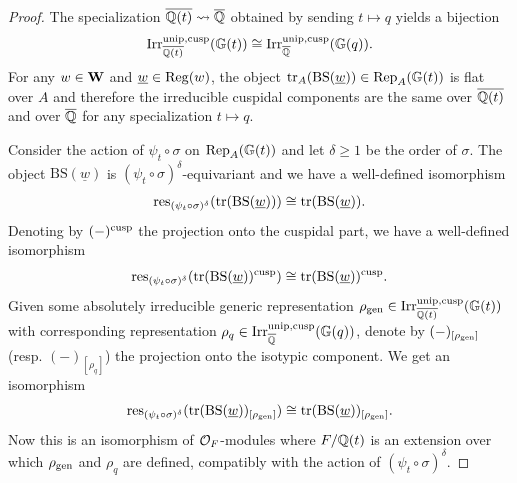 \documentclass[a4paper, 10pt, oneside, reqno]{amsart}
\theoremstyle{plain}
\theoremstyle{definition}
\theoremstyle{remark}
\newcommand{\Gbb}{\mathbb{G}}
\newcommand{\BS}{\mathrm{BS}}
\newcommand{\restr}{\mathrm{res}}
\begin{document}
\begin{proof}
The specialization $\overline{\mathbb{Q}(t)} \rightsquigarrow \overline{\mathbb{Q}}$ obtained by sending $t \mapsto q$ yields a bijection 
$$\Irr_{\overline{\Q(t)}}^{\unip, \cusp}(\Gbb(t)) \cong \Irr^{\unip, \cusp}_{\overline{\Q}}(\Gbb(q)).$$
For any $w\in\mathbf{W}$ and $\underline{w}\in\mathrm{Reg}(w)$, the object $\tr_A(\BS(\underline{w})) \in \Rep_A(\Gbb(t))$ is flat over $A$ and therefore the irreducible cuspidal components are the same over $\overline{\mathbb{Q}(t)}$ and over $\overline{\mathbb{Q}}$ for any specialization $t \mapsto q$. 

Consider the action of $\psi_t \circ \sigma$ on $\Rep_A(\Gbb(t))$ and let $\delta \geq 1$ be the order of $\sigma$. The object $\BS(\underline{w})$ is $(\psi_t \circ \sigma)^{\delta}$-equivariant and we have a well-defined isomorphism 
$$\restr_{(\psi_t \circ \sigma)^{\delta}}(\tr(\BS(\underline{w}))) \cong \tr(\BS(\underline{w})).$$
Denoting by $(-)^{\mathrm{cusp}}$ the projection onto the cuspidal part, we have a well-defined isomorphism 
$$\restr_{(\psi_t \circ \sigma)^{\delta}}(\tr(\BS(\underline{w}))^{\cusp}) \cong \tr(\BS(\underline{w}))^{\cusp}.$$
Given some absolutely irreducible generic  representation $\rho_{\gen} \in \Irr_{\overline{\Q(t)}}^{\unip, \cusp}(\Gbb(t))$ with corresponding representation $\rho_q \in \Irr^{\unip, \cusp}_{\overline{\Q}}(\Gbb(q))$, denote by $(-)_{[\rho_{\mathrm{gen}}]}$ (resp. $(-)_{[\rho_q]}$) the projection onto the isotypic component. We get an isomorphism 
$$\restr_{(\psi_t \circ \sigma)^{\delta}}(\tr(\BS(\underline{w}))_{[\rho_{\gen}]}) \cong \tr(\BS(\underline{w}))_{[\rho_{\gen}]}.$$
Now this is an isomorphism of $\mathcal{O}_F$-modules where $F/\mathbb{Q}(t)$ is an extension over which $\rho_{\mathrm{gen}}$ and $\rho_q$ are defined, compatibly with the action of $(\psi_t \circ \sigma)^{\delta}$. 


\end{proof}
\end{document}

